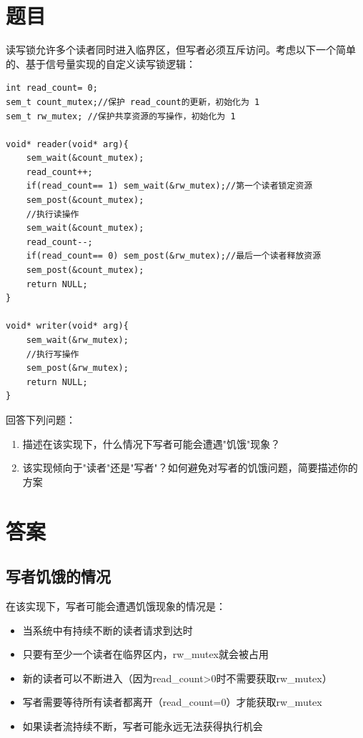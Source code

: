 \section{题目}

读写锁允许多个读者同时进入临界区，但写者必须互斥访问。考虑以下一个简单的、基于信号量实现的自定义读写锁逻辑：
\begin{lstlisting}[style=cleancpp]
int read_count= 0;
sem_t count_mutex;//保护 read_count的更新，初始化为 1
sem_t rw_mutex; //保护共享资源的写操作，初始化为 1

void* reader(void* arg){ 
    sem_wait(&count_mutex); 
    read_count++;
    if(read_count== 1) sem_wait(&rw_mutex);//第一个读者锁定资源 
    sem_post(&count_mutex);
    //执行读操作
    sem_wait(&count_mutex);
    read_count--;
    if(read_count== 0) sem_post(&rw_mutex);//最后一个读者释放资源 
    sem_post(&count_mutex); 
    return NULL;
}

void* writer(void* arg){ 
    sem_wait(&rw_mutex);
    //执行写操作
    sem_post(&rw_mutex); 
    return NULL;
}
\end{lstlisting}

回答下列问题：
\begin{enumerate}
    \item 描述在该实现下，什么情况下写者可能会遭遇"饥饿"现象？
    \item 该实现倾向于"读者"还是"写者"？如何避免对写者的饥饿问题，简要描述你的方案
\end{enumerate}

\section{答案}
\subsection{写者饥饿的情况}

在该实现下，写者可能会遭遇饥饿现象的情况是：
\begin{itemize}
    \item 当系统中有持续不断的读者请求到达时
    \item 只要有至少一个读者在临界区内，rw\_mutex就会被占用
    \item 新的读者可以不断进入（因为read\_count>0时不需要获取rw\_mutex）
    \item 写者需要等待所有读者都离开（read\_count=0）才能获取rw\_mutex
    \item 如果读者流持续不断，写者可能永远无法获得执行机会
\end{itemize}

